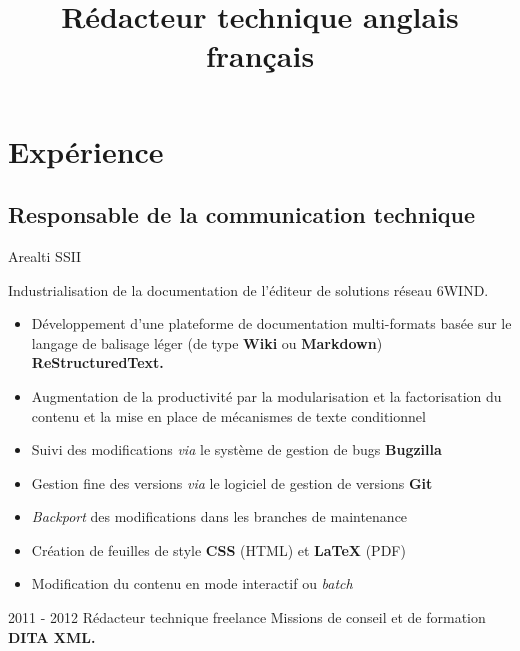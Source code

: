 \documentclass[11pt,a4paper,roman]{moderncv}
\title{Rédacteur technique anglais français}
\begin{document}
\makecvtitle %


\section{Expérience}

\subsection{Responsable de la communication technique}

        {Arealti}
        {SSII}
        {}
        {}
        {Industrialisation de la documentation de l'éditeur de solutions réseau
          6WIND.
          \begin{itemize}
          \item Développement d'une plateforme de documentation multi-formats
            basée sur le langage de balisage léger (de type \textbf{Wiki} ou
            \textbf{Markdown}) \textbf{ReStructuredText.}
          \item Augmentation de la productivité par la modularisation et la
            factorisation du contenu et la mise en place de mécanismes de texte
            conditionnel
          \item Suivi des modifications \textit{via} le système de gestion de
            bugs \textbf{Bugzilla}
          \item Gestion fine des versions \textit{via} le logiciel de gestion de
            versions \textbf{Git}
          \item \textit{Backport} des modifications dans les branches de
            maintenance
          \item Création de feuilles de style \textbf{CSS} (HTML) et
            \textbf{\LaTeX} (PDF)
          \item Modification du contenu en mode interactif ou \textit{batch}
        \end{itemize}
    }


\cventry
    {2011 - 2012}
    {Rédacteur technique freelance}
    {\textsc{}}
    {}
    {}
    {Missions de conseil et de formation \textbf{DITA XML.}}
\end{document}
